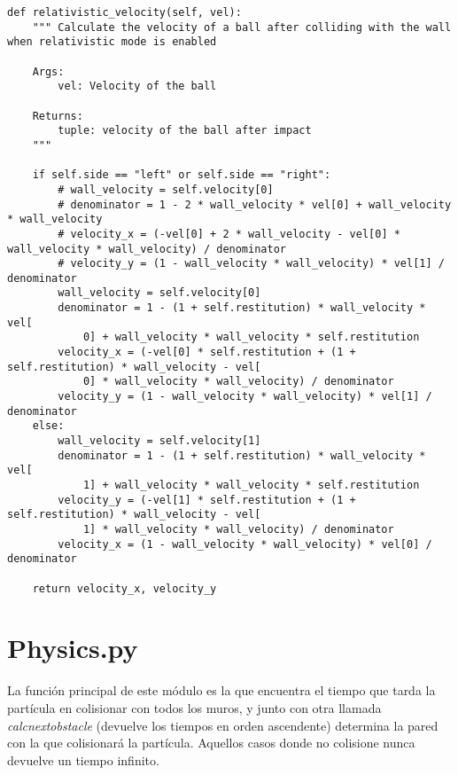 \begin{lstlisting}[breaklines]
def relativistic_velocity(self, vel):
    """ Calculate the velocity of a ball after colliding with the wall when relativistic mode is enabled

    Args:
        vel: Velocity of the ball

    Returns:
        tuple: velocity of the ball after impact
    """

    if self.side == "left" or self.side == "right":
        # wall_velocity = self.velocity[0]
        # denominator = 1 - 2 * wall_velocity * vel[0] + wall_velocity * wall_velocity
        # velocity_x = (-vel[0] + 2 * wall_velocity - vel[0] * wall_velocity * wall_velocity) / denominator
        # velocity_y = (1 - wall_velocity * wall_velocity) * vel[1] / denominator
        wall_velocity = self.velocity[0]
        denominator = 1 - (1 + self.restitution) * wall_velocity * vel[
            0] + wall_velocity * wall_velocity * self.restitution
        velocity_x = (-vel[0] * self.restitution + (1 + self.restitution) * wall_velocity - vel[
            0] * wall_velocity * wall_velocity) / denominator
        velocity_y = (1 - wall_velocity * wall_velocity) * vel[1] / denominator
    else:
        wall_velocity = self.velocity[1]
        denominator = 1 - (1 + self.restitution) * wall_velocity * vel[
            1] + wall_velocity * wall_velocity * self.restitution
        velocity_y = (-vel[1] * self.restitution + (1 + self.restitution) * wall_velocity - vel[
            1] * wall_velocity * wall_velocity) / denominator
        velocity_x = (1 - wall_velocity * wall_velocity) * vel[0] / denominator

    return velocity_x, velocity_y
\end{lstlisting}

\section*{Physics.py}

La función principal de este módulo es la que encuentra el tiempo que tarda la partícula en colisionar con todos los muros, y junto con otra llamada \textit{calc\textunderscore next\textunderscore obstacle} (devuelve los tiempos en orden ascendente) determina la pared con la que colisionará la partícula. Aquellos casos donde no colisione nunca devuelve un tiempo infinito.

